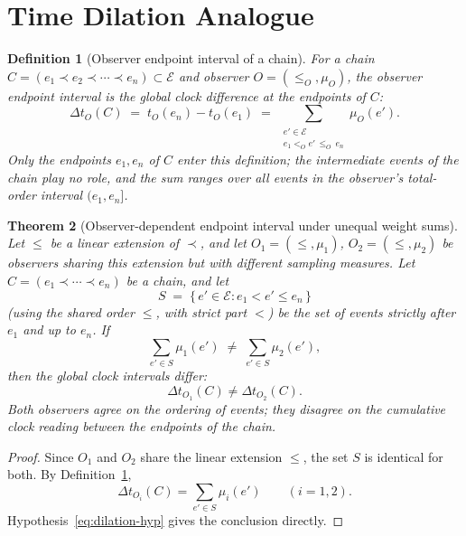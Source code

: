 \documentclass[12pt]{article}
\newtheorem{theorem}{Theorem}
\newtheorem{definition}[theorem]{Definition}
\newcommand{\Ecal}{\mathcal{E}}
\begin{document}
\section{Time Dilation Analogue}\label{sec:dilation}

\begin{definition}[Observer endpoint interval of a chain]\label{def:elapsed}
For a chain $C = (e_1 \prec e_2 \prec \cdots \prec e_n) \subset \Ecal$ and observer $O = (\leq_O, \mu_O)$, the \textit{observer endpoint interval} is the global clock difference at the endpoints of $C$:
\begin{equation}\label{eq:elapsed}
    \Delta t_O(C) \;=\; t_O(e_n) - t_O(e_1) \;=\; \sum_{\substack{e' \in \Ecal \\ e_1 <_O e' \,\leq_O\, e_n}} \mu_O(e').
\end{equation}
Only the endpoints $e_1, e_n$ of $C$ enter this definition; the intermediate events of the chain play no role, and the sum ranges over all events in the observer's total-order interval $(e_1, e_n]$.
\end{definition}

\begin{theorem}[Observer-dependent endpoint interval under unequal weight sums]\label{thm:dilation}
Let $\leq$ be a linear extension of $\prec$, and let $O_1 = (\leq, \mu_1)$, $O_2 = (\leq, \mu_2)$ be observers sharing this extension but with different sampling measures. Let $C = (e_1 \prec \cdots \prec e_n)$ be a chain, and let
\[
    S \;=\; \{\,e' \in \Ecal : e_1 < e' \leq e_n\,\}
\]
(using the shared order $\leq$, with strict part $<$) be the set of events strictly after $e_1$ and up to $e_n$. If
\begin{equation}\label{eq:dilation-hyp}
    \sum_{e' \in S} \mu_1(e') \;\neq\; \sum_{e' \in S} \mu_2(e'),
\end{equation}
then the global clock intervals differ:
\begin{equation}
    \Delta t_{O_1}(C) \neq \Delta t_{O_2}(C).
\end{equation}
Both observers agree on the ordering of events; they disagree on the cumulative clock reading between the endpoints of the chain.
\end{theorem}

\begin{proof}
Since $O_1$ and $O_2$ share the linear extension $\leq$, the set $S$ is identical for both. By Definition~\ref{def:elapsed},
\[
    \Delta t_{O_i}(C) = \sum_{e' \in S} \mu_i(e') \qquad (i=1,2).
\]
Hypothesis~\eqref{eq:dilation-hyp} gives the conclusion directly.
\end{proof}
\end{document}
